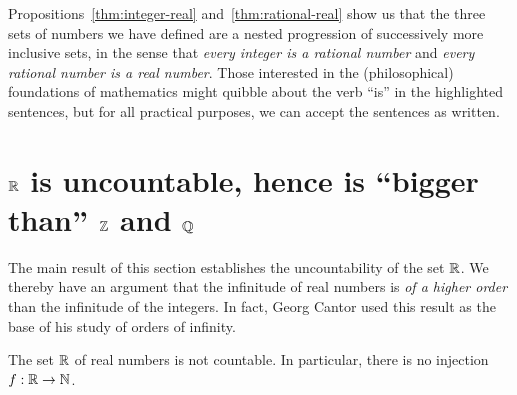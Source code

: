 \bigskip

Propositions~\ref{thm:integer-real} and~\ref{thm:rational-real} show
us that the three sets of numbers we have defined are a nested
progression of successively more inclusive sets, in the sense that
{\em every integer is a rational number} and {\em every rational
  number is a real number}.  Those interested in the (philosophical)
foundations of mathematics might quibble about the verb ``is'' in the
highlighted sentences, but for all practical purposes, we can accept
the sentences as written.

\section{$\mathbb{R}$ is uncountable, hence is ``bigger than'' $\mathbb{Z}$ and $\mathbb{Q}$}
\label{sec:Q-Z-R-cardinality}
\label{sec:Reals-uncountable}


The main result of this section establishes the uncountability of the
set $\mathbb{R}$.  We thereby have an argument that the infinitude of real
numbers is {\em of a higher order} than the infinitude of the
integers.  In fact, Georg Cantor used this result as the base of
his study of orders of infinity.

\begin{prop}
\label{thm:R-uncountable}
The set $\mathbb{R}$ of real numbers is not countable.
In particular, there is no injection $f: \mathbb{R} \rightarrow \mathbb{N}$.
\end{prop}

